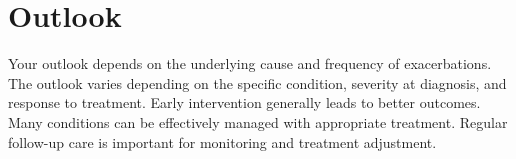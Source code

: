 \section{Outlook}
Your outlook depends on the underlying cause and frequency of exacerbations. The outlook varies depending on the specific condition, severity at diagnosis, and response to treatment. Early intervention generally leads to better outcomes. Many conditions can be effectively managed with appropriate treatment. Regular follow-up care is important for monitoring and treatment adjustment.
